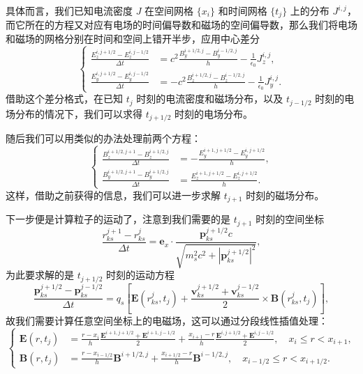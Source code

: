 具体而言，我们已知电流密度 $J$ 在空间网格 $\{x_i\}$ 和时间网格 $\{t_j\}$ 上的分布 $J^{i,j}$，而它所在的方程又对应有电场的时间偏导数和磁场的空间偏导数，那么我们将电场和磁场的网格分别在时间和空间上错开半步，应用中心差分
\begin{equation}
\left\{
\begin{aligned}
\frac{E_z^{i,j+1/2}-E_z^{i,j-1/2}}{\Delta t}&=c^2\frac{B_y^{i+1/2,j}-B_y^{i-1/2,j}}h-\frac1{\epsilon_0}J_z^{i,j},\\
\frac{E_y^{i,j+1/2}-E_y^{i,j-1/2}}{\Delta t}&=-c^2\frac{B_z^{i+1/2,j}-B_z^{i-1/2,j}}h-\frac1{\epsilon_0}J_y^{i,j}.
\end{aligned}
\right.
\tag{7.5.13}
\end{equation}
借助这个差分格式，在已知 $t_j$ 时刻的电流密度和磁场分布，以及 $t_{j-1/2}$ 时刻的电场分布的情况下，我们可以求得 $t_{j+1/2}$ 时刻的电场分布。

随后我们可以用类似的办法处理前两个方程：
\begin{equation}
\left\{
\begin{aligned}
\frac{B_z^{i+1/2,j+1}-B_z^{i+1/2,j}}{\Delta t}&=-\frac{E_y^{i+1,j+1/2}-E_y^{i,j+1/2}}h,\\
\frac{B_y^{i+1/2,j+1}-B_y^{i+1/2,j}}{\Delta t}&=\frac{E_z^{i+1,j+1/2}-E_z^{i,j+1/2}}h.
\end{aligned}
\right.
\tag{7.5.14}
\end{equation}
这样，借助之前获得的信息，我们可以进一步求解 $t_{j+1}$ 时刻的磁场分布。

下一步便是计算粒子的运动了，注意到我们需要的是 $t_{j+1}$ 时刻的空间坐标
\begin{equation}
\frac{r_{ks}^{j+1}-r_{ks}^{j}}{\Delta t}=\mathbf e_x\cdot\frac{\mathbf p_{ks}^{j+1/2}c}{\sqrt{m_s^2c^2+|\mathbf p_{ks}^{j+1/2}|^2}},
\tag{7.5.15}
\end{equation}
为此要求解的是 $t_{j+1/2}$ 时刻的运动方程
\begin{equation}
\frac{\mathbf p_{ks}^{j+1/2}-\mathbf p_{ks}^{j-1/2}}{\Delta t}=q_s\left[\mathbf E(r_{ks}^{j},t_j)+\frac{\mathbf v_{ks}^{j+1/2}+\mathbf v_{ks}^{j-1/2}}2\times\mathbf B(r_{ks}^{j},t_j)\right],
\tag{7.5.16}
\end{equation}
故我们需要计算任意空间坐标上的电磁场，这可以通过分段线性插值处理：
\begin{equation}
\left\{
\begin{aligned}
\mathbf E(r,t_j)&=\frac{r-x_i}{h}\frac{\mathbf E^{i+1,j+1/2}+\mathbf E^{i+1,j-1/2}}2+\frac{x_{i+1}-r}{h}\frac{\mathbf E^{i,j+1/2}+\mathbf E^{i,j-1/2}}2,
\quad x_i\le r<x_{i+1},\\
\mathbf B(r,t_j)&=\frac{r-x_{i-1/2}}h\mathbf B^{i+1/2,j}+\frac{x_{i+1/2}-r}h\mathbf B^{i-1/2,j},
\quad x_{i-1/2}\le r<x_{i+1/2}.
\end{aligned}
\right.
\tag{7.5.17}
\end{equation}


